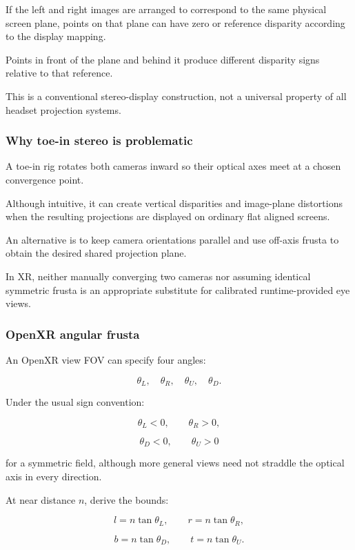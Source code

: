 If the left and right images are arranged to correspond to the same physical screen plane, points on that plane can have zero or reference disparity according to the display mapping.

Points in front of the plane and behind it produce different disparity signs relative to that reference.

This is a conventional stereo-display construction, not a universal property of all headset projection systems.

\subsubsection{Why toe-in stereo is problematic}\label{why-toe-in-stereo-is-problematic}

A toe-in rig rotates both cameras inward so their optical axes meet at a chosen convergence point.

Although intuitive, it can create vertical disparities and image-plane distortions when the resulting projections are displayed on ordinary flat aligned screens.

An alternative is to keep camera orientations parallel and use off-axis frusta to obtain the desired shared projection plane.

In XR, neither manually converging two cameras nor assuming identical symmetric frusta is an appropriate substitute for calibrated runtime-provided eye views.

\subsubsection{OpenXR angular frusta}\label{openxr-angular-frusta}

An OpenXR view FOV can specify four angles:

\[ \theta_L,\quad\theta_R,\quad\theta_U,\quad\theta_D. \]

Under the usual sign convention:

\[ \theta_L<0,\qquad\theta_R>0, \]

\[ \theta_D<0,\qquad\theta_U>0 \]

for a symmetric field, although more general views need not straddle the optical axis in every direction.

At near distance \(n\), derive the bounds:

\[ \boxed{ l=n\tan\theta_L,\qquad r=n\tan\theta_R, } \]

\[ \boxed{ b=n\tan\theta_D,\qquad t=n\tan\theta_U. } \]

